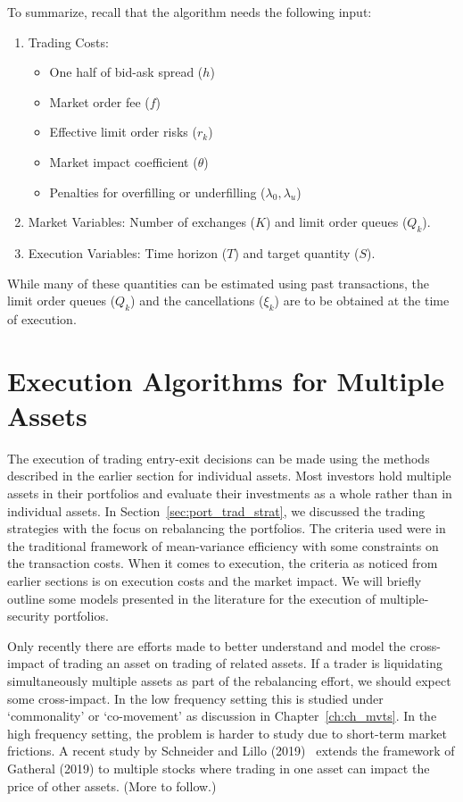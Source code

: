 To summarize, recall that the algorithm needs the following input:
	\begin{enumerate}[--]
	\item Trading Costs: 
		\begin{itemize}
		\item One half of bid-ask spread ($h$)
		\item Market order fee ($f$)
		\item Effective limit order risks ($r_k$)
		\item Market impact coefficient ($\theta$)
		\item Penalties for overfilling or underfilling ($\lambda_0,\lambda_u$)
		\end{itemize}
	\item Market Variables: Number of exchanges ($K$) and limit order queues ($Q_k$).
	\item Execution Variables: Time horizon ($T$) and target quantity ($S$).
	\end{enumerate}
While many of these quantities can be estimated using past transactions, the limit order queues ($Q_k$) and the cancellations ($\xi_k$) are to be obtained at the time of execution.

\section{Execution Algorithms for Multiple Assets}

The execution of trading entry-exit decisions can be made using the methods described in the earlier section for individual assets. Most investors hold multiple assets in their portfolios and evaluate their investments as a whole rather than in individual assets. In Section~\ref{sec:port_trad_strat}, we discussed the trading strategies with the focus on rebalancing the portfolios. The criteria used were in the traditional framework of mean-variance efficiency with some constraints on the transaction costs. When it comes to execution, the criteria as noticed from earlier sections is on execution costs and the market impact. We will briefly outline some models presented in the literature for the execution of multiple-security portfolios.


Only recently there are efforts made to better understand and model the cross-impact of trading an asset on trading of related assets. If a trader is liquidating simultaneously multiple assets as part of the rebalancing effort, we should expect some cross-impact. In the low frequency setting this is studied under `commonality' or `co-movement' as discussion in Chapter~\ref{ch:ch_mvts}. In the high frequency setting, the problem is harder to study due to short-term market frictions. A recent study by Schneider and Lillo (2019)~\cite{schnlillo19} extends the framework of Gatheral (2019) to multiple stocks where trading in one asset can impact the price of other assets. (More to follow.) 


